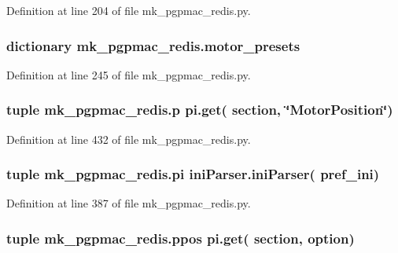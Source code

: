 Definition at line 204 of file mk\-\_\-pgpmac\-\_\-redis.\-py.

\hypertarget{namespacemk__pgpmac__redis_a2a04d8d0b7270384d1fac674c29e774a}{
\subsubsection[{motor\-\_\-presets}]{\setlength{\rightskip}{0pt plus 5cm}dictionary mk\-\_\-pgpmac\-\_\-redis.\-motor\-\_\-presets}}\label{namespacemk__pgpmac__redis_a2a04d8d0b7270384d1fac674c29e774a}


Definition at line 245 of file mk\-\_\-pgpmac\-\_\-redis.\-py.

\hypertarget{namespacemk__pgpmac__redis_a11daf2847f2dc94562b5b61b3f412574}{
\subsubsection[{p}]{\setlength{\rightskip}{0pt plus 5cm}tuple mk\-\_\-pgpmac\-\_\-redis.\-p pi.\-get( section, \char`\"{}Motor\-Position\char`\"{})}}\label{namespacemk__pgpmac__redis_a11daf2847f2dc94562b5b61b3f412574}


Definition at line 432 of file mk\-\_\-pgpmac\-\_\-redis.\-py.

\hypertarget{namespacemk__pgpmac__redis_a2f5bbda0250eecd94d166dc0a2fbff86}{
\subsubsection[{pi}]{\setlength{\rightskip}{0pt plus 5cm}tuple mk\-\_\-pgpmac\-\_\-redis.\-pi {\bf ini\-Parser.\-ini\-Parser}( {\bf pref\-\_\-ini})}}\label{namespacemk__pgpmac__redis_a2f5bbda0250eecd94d166dc0a2fbff86}


Definition at line 387 of file mk\-\_\-pgpmac\-\_\-redis.\-py.

\hypertarget{namespacemk__pgpmac__redis_aadd7321b8f7efe139c3e92e51cd34c00}{
\subsubsection[{ppos}]{\setlength{\rightskip}{0pt plus 5cm}tuple mk\-\_\-pgpmac\-\_\-redis.\-ppos pi.\-get( section, option)}}\label{namespacemk__pgpmac__redis_aadd7321b8f7efe139c3e92e51cd34c00}


